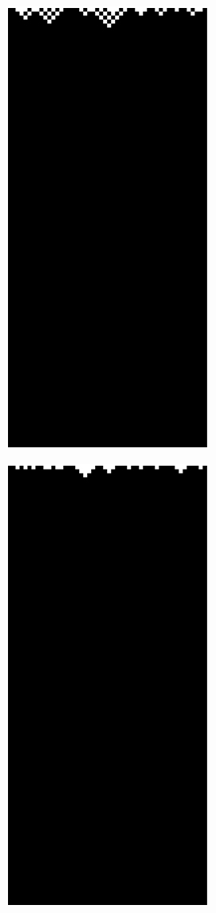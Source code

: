  \begin{figure}
 \caption{Class 3 (a,b) and 4 (c,d) elementary cellular automata}
 \label{class34}
\centering
    \begin{subfigure}[b]{0.275\textwidth}
		\centering
		\caption[]{}
		\label{fig:34first}
		
		\includegraphics[scale=0.32]{./images/CA_FDM/rule250}
\caption[]{}%
   \end{subfigure}%
    \begin{subfigure}[b]{0.275\textwidth}
		\centering
		\includegraphics[scale=0.32]{./images/CA_FDM/rule254}

\end{subfigure}
\end{figure}
